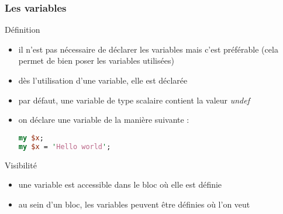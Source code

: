 \begin{frame}[fragile]
  \frametitle{Les variables}

  \begin{block}{Définition}
    \begin{itemize}
      \item il n'est pas nécessaire de déclarer les variables mais c'est
        préférable (cela permet de bien poser les variables utilisées)
      \item dès l'utilisation d'une variable, elle est déclarée
      \item par défaut, une variable de type scalaire contient la valeur
        \textit{undef}
      \item on déclare une variable de la manière suivante :
        \begin{lstlisting}[language=perl]
my $x;
my $x = 'Hello world';
        \end{lstlisting}
    \end{itemize}
  \end{block}

  \begin{alertblock}{Visibilité}
    \begin{itemize}
    \item une variable est accessible dans le bloc où elle est définie
    \item au sein d'un bloc, les variables peuvent être définies où l'on veut
    \end{itemize}
  \end{alertblock}

\end{frame}


